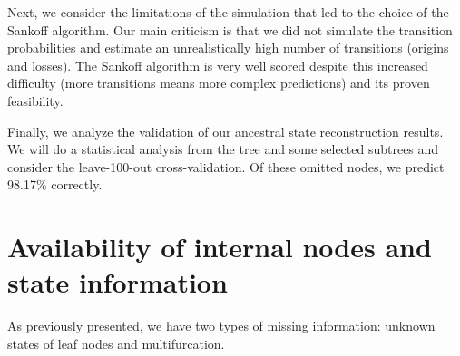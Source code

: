   Next, we consider the limitations of the simulation that led to the choice of the Sankoff 
    algorithm. Our main criticism is that we did not simulate the transition probabilities and 
    estimate an unrealistically high number of transitions (origins and losses). The Sankoff 
    algorithm is very well scored despite this increased difficulty (more transitions means more 
    complex predictions) and its proven feasibility.

  Finally, we analyze the validation of our ancestral state reconstruction results. We will do a 
    statistical analysis from the tree and some selected subtrees and consider the leave-100-out 
    cross-validation. Of these omitted nodes, we predict 98.17\% correctly. \\

  \section{Availability of internal nodes and state information}
    As previously presented, we have two types of missing information: unknown states of leaf nodes 
      and multifurcation.

